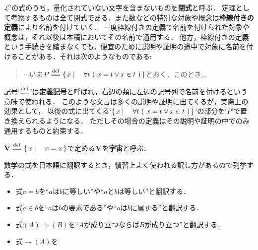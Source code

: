 	$\mathcal{L}'$の式のうち，量化されていない文字を含まないものを{\bf 閉式}と呼ぶ．
	定理として考察するものは全て閉式である．また数などの特別な対象や概念は{\bf 枠線付きの定義}により名前を付けていく．
	一度枠線付きの定義で名前を付けられた対象や概念は，それ以後は本稿においてその名前で通用する．
	他方，枠線付きの定義という手続きを踏まなくても，便宜のために説明や証明の途中で対象に名前を付けることがある．それは次のようなものである: 
	\begin{quote}
		$\cdots$いま$P \defeq \Set{x}{\forall t\ (\ x = t \vee x \in t\ )}$とおく．このとき...
	\end{quote}
	記号`$\defeq$'は{\bf 定義記号}と呼ばれ，右辺の類に左辺の記号列で名前を付けるという意味で使われる．
	このような文言は多くの説明や証明に出てくるが，実際上の効果として，
	以後の式に出てくる`$\Set{x}{\forall t\ (\ x = t \vee x \in t\ )}$'の部分を`$P$'で置き換えられるようになる．
	ただしその場合の定義はその説明や証明の中でのみ通用するものと約束する．
	
	\begin{screen}
		\begin{dfn}[宇宙]
			$\Univ \defeq \Set{x}{x=x}$で定める$\mathbf{V}$を{\bf 宇宙}と呼ぶ．
		\end{dfn}
	\end{screen}
	
	
	数学の式を日本語に翻訳するとき，慣習上よく使われる訳し方があるので列挙する．
	\begin{itemize}
		\item 式$a = b$を``$a$は$b$に等しい''や``$a$と$b$は等しい''と翻訳する．
		\item 式$a \in b$を``$a$は$b$の要素である''や``$a$は$b$に属する''と翻訳する．
		\item 式$(A) \Longrightarrow (B)$を``$A$が成り立つならば$B$が成り立つ''と翻訳する．
		\item 式$\rightharpoondown (A)$を%
	\end{itemize}
	
